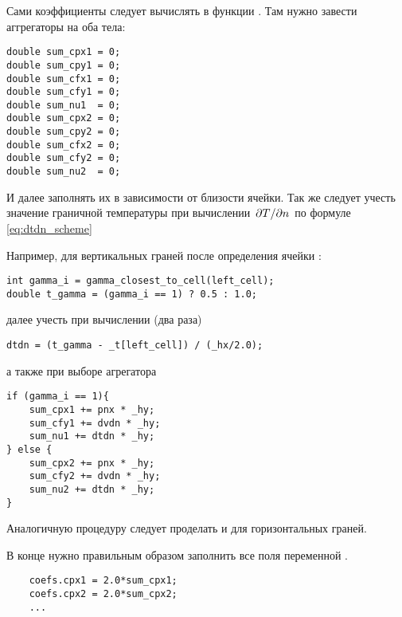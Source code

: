 Сами коэффициенты следует вычислять в функции .
Там нужно завести аггрегаторы на оба тела:
\begin{verbatim}
double sum_cpx1 = 0;
double sum_cpy1 = 0;
double sum_cfx1 = 0;
double sum_cfy1 = 0;
double sum_nu1  = 0;
double sum_cpx2 = 0;
double sum_cpy2 = 0;
double sum_cfx2 = 0;
double sum_cfy2 = 0;
double sum_nu2  = 0;
\end{verbatim}

И далее заполнять их в зависимости от близости ячейки.
Так же следует учесть значение граничной температуры
при вычислении $\left.\partial T\middle/\partial n\right.$ по формуле \cref{eq:dtdn_scheme}

Например, для вертикальных граней
после определения ячейки :
\begin{verbatim}
int gamma_i = gamma_closest_to_cell(left_cell);
double t_gamma = (gamma_i == 1) ? 0.5 : 1.0;
\end{verbatim}
далее учесть при вычислении  (два раза)
\begin{verbatim}
dtdn = (t_gamma - _t[left_cell]) / (_hx/2.0);
\end{verbatim}
а также при выборе агрегатора
\begin{verbatim}
if (gamma_i == 1){
	sum_cpx1 += pnx * _hy;
	sum_cfy1 += dvdn * _hy;
	sum_nu1 += dtdn * _hy;
} else {
	sum_cpx2 += pnx * _hy;
	sum_cfy2 += dvdn * _hy;
	sum_nu2 += dtdn * _hy;
}
\end{verbatim}

Аналогичную процедуру следует проделать и для горизонтальных граней.

В конце нужно правильным образом заполнить все поля
переменной .
\begin{verbatim}
	coefs.cpx1 = 2.0*sum_cpx1;
	coefs.cpx2 = 2.0*sum_cpx2;
	...
\end{verbatim}
